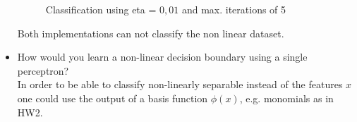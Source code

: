 \documentclass{article}
\begin{document}
\begin{itemize}
	\begin{figure}[!ht]
	\caption{Classification using eta = $0,01$ and max. iterations of 5}
	\label{perceptron1}
	\end{figure}

    Both implementations can not classify the non linear dataset.\\
    
    \item How would you learn a non-linear decision boundary using a single perceptron?\\
    
In order to be able to classify non-linearly separable instead of the features $x$ one could use the output of a basis function $\phi(x)$, e.g. monomials as in HW2.
	
	
\end{itemize}
\end{document}
